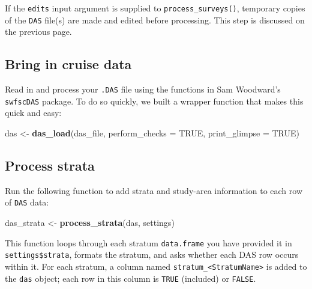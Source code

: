 \documentclass[
]{book}
\newenvironment{Shaded}{\begin{snugshade}}{\end{snugshade}}
\newcommand{\AttributeTok}[1]{\textcolor[rgb]{0.13,0.29,0.53}{#1}}
\newcommand{\ConstantTok}[1]{\textcolor[rgb]{0.56,0.35,0.01}{#1}}
\newcommand{\FunctionTok}[1]{\textcolor[rgb]{0.13,0.29,0.53}{\textbf{#1}}}
\newcommand{\NormalTok}[1]{#1}
\newcommand{\OtherTok}[1]{\textcolor[rgb]{0.56,0.35,0.01}{#1}}
\begin{document}
If the \texttt{edits} input argument is supplied to \texttt{process\_surveys()}, temporary copies of the \texttt{DAS} file(s) are made and edited before processing. This step is discussed on the previous page.

\hypertarget{bring-in-cruise-data}{%
\subsection*{Bring in cruise data}\label{bring-in-cruise-data}}

Read in and process your \texttt{.DAS} file using the functions in Sam Woodward's \texttt{swfscDAS} package. To do so quickly, we built a wrapper function that makes this quick and easy:

\begin{Shaded}
\begin{Highlighting}[]
\NormalTok{das }\OtherTok{\textless{}{-}} \FunctionTok{das\_load}\NormalTok{(das\_file, }
                \AttributeTok{perform\_checks =} \ConstantTok{TRUE}\NormalTok{,}
                \AttributeTok{print\_glimpse =} \ConstantTok{TRUE}\NormalTok{)}
\end{Highlighting}
\end{Shaded}

\hypertarget{process-strata}{%
\subsection*{Process strata}\label{process-strata}}

Run the following function to add strata and study-area information to each row of \texttt{DAS} data:

\begin{Shaded}
\begin{Highlighting}[]
\NormalTok{das\_strata }\OtherTok{\textless{}{-}} \FunctionTok{process\_strata}\NormalTok{(das, settings)}
\end{Highlighting}
\end{Shaded}

This function loops through each stratum \texttt{data.frame} you have provided it in \texttt{settings\$strata}, formats the stratum, and asks whether each DAS row occurs within it. For each stratum, a column named \texttt{stratum\_\textless{}StratumName\textgreater{}} is added to the \texttt{das} object; each row in this column is \texttt{TRUE} (included) or \texttt{FALSE}.
\end{document}
